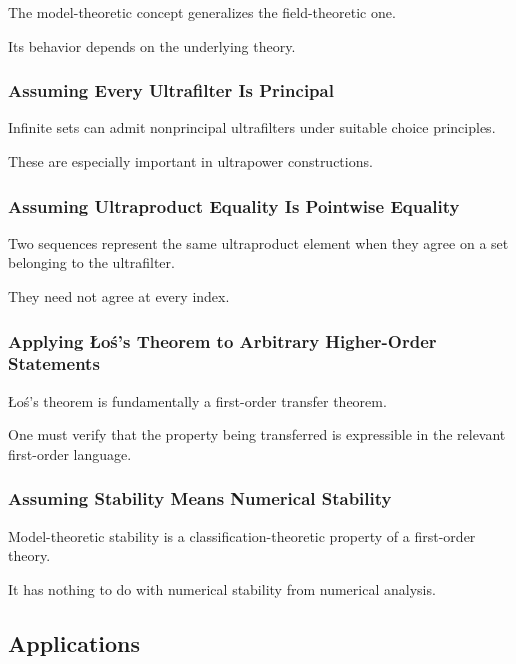 The model-theoretic concept generalizes the field-theoretic one.

Its behavior depends on the underlying theory.

\subsubsection{Assuming Every Ultrafilter Is Principal}

Infinite sets can admit nonprincipal ultrafilters under suitable choice
principles.

These are especially important in ultrapower constructions.

\subsubsection{Assuming Ultraproduct Equality Is Pointwise Equality}

Two sequences represent the same ultraproduct element when they agree on a
set belonging to the ultrafilter.

They need not agree at every index.

\subsubsection{Applying Łoś's Theorem to Arbitrary Higher-Order Statements}

Łoś's theorem is fundamentally a first-order transfer theorem.

One must verify that the property being transferred is expressible in the
relevant first-order language.

\subsubsection{Assuming Stability Means Numerical Stability}

Model-theoretic stability is a classification-theoretic property of a
first-order theory.

It has nothing to do with numerical stability from numerical analysis.

\subsection{Applications}
\label{subsec:model-theory-applications}

